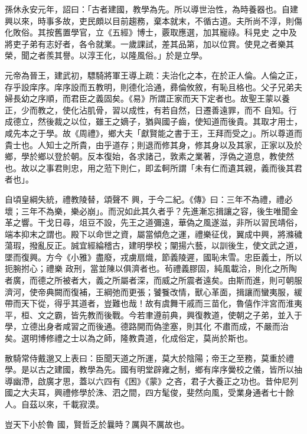 \begin{pinyinscope}
 孫休永安元年，詔曰：「古者建國，教學為先。所以導世治性，為時養器也。自建興以來，時事多故，吏民頗以目前趨務，棄本就末，不循古道。夫所尚不淳，則傷化敗俗。其按舊置學官，立《五經》博士，覈取應選，加其寵祿。科見史
 之中及將吏子弟有志好者，各令就業。一歲課試，差其品第，加以位賞。使見之者樂其榮，聞之者羨其譽。以淳王化，以隆風俗。」於是立學。



 元帝為晉王，建武初，驃騎將軍王導上疏：夫治化之本，在於正人倫。人倫之正，存乎設庠序。庠序設而五教明，則德化洽通，彞倫攸敘，有恥且格也。父子兄弟夫婦長幼之序順，而君臣之義固矣。《易》所謂正家而天下定者也。故聖王蒙以養正，少而教之，使化沾肌骨，習以成性，有若自然，日遷善遠罪，而不
 自知。行成德立，然後裁之以位，雖王之嫡子，猶與國子齒，使知道而後貴。其取才用士，咸先本之于學。故《周禮》，鄉大夫「獻賢能之書于王，王拜而受之」。所以尊道而貴士也。人知士之所貴，由乎道存；則退而修其身，修其身以及其家，正家以及於鄉，學於鄉以登於朝。反本復始，各求諸己，敦素之業著，浮偽之道息，教使然也。故以之事君則忠，用之蒞下則仁，即孟軻所謂「未有仁而遺其親，義而後其君者也」。



 自頃皇綱失統，禮教陵替，頌聲不
 興，于今二紀。《傳》曰：三年不為禮，禮必壞；三年不為樂，樂必崩」。而況如此其久者乎？先進漸忘揖讓之容，後生唯聞金革之響。干戈日尋，俎豆不設，先王之道彌遠，華偽之風遂滋，非所以習民靖俗，端本抑末之謂也。殿下以命世之資，屬當傾危之運，禮樂征伐，翼成中興，將滌穢蕩瑕，撥亂反正。誠宜經綸稽古，建明學校；闡揚六藝，以訓後生，使文武之道，墜而復興。方今《小雅》盡廢，戎虜扇熾，節義陵遲，國恥未雪。忠臣義士，所以扼腕拊心；禮樂
 政刑，當並陳以俱濟者也。茍禮義膠固，純風載洽，則化之所陶者廣，而德之所被者大，義之所屬者深，而威之所震者遠矣。由斯而進，則可朝服濟河，使帝典闕而復補，王綱弛而更張；饕餮改情，獸心革面，揖讓而蠻夷服，緩帶而天下從，得乎其道者，豈難也哉！故有虞舞干戚而三苗化，魯僖作泮宮而淮夷平，桓、文之霸，皆先教而後戰。今若聿遵前典，興復教道，使朝之子弟，並入于學，立德出身者咸習之而後通。德路開而偽塗塞，則其化
 不肅而成，不嚴而治矣。選明博修禮之士以為之師，隆教貴道，化成俗定，莫尚於斯也。



 散騎常侍戴邈又上表曰：臣聞天道之所運，莫大於陰陽；帝王之至務，莫重於禮學。是以古之建國，教學為先。國有明堂辟雍之制，鄉有庠序黌校之儀，皆所以抽導幽滯，啟廣才思，蓋以六四有《困》《蒙》之吝，君子大養正之功也。昔仲尼列國之大夫耳，興禮修學於洙、泗之間，四方髦俊，斐然向風，受業身通者七十餘人。自茲以來，千載寂漠。



 豈天下小於魯
 國，賢哲乏於曩時？厲與不厲故也。




\end{pinyinscope}
